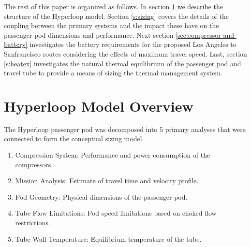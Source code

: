 \documentclass[heading.tex]{subfiles}
\begin{document}
The rest of this paper is organized as follows. In section \ref{s:struct} we describe the structure of the Hyperloop 
model. Section \ref{s:sizing} covers the details of the coupling between the primary systems and the impact these have 
on the passenger pod dimensions and performance. Next section \ref{sec:compressor-and-battery}
investigates the battery requirements for the proposed Los Angeles to Sanfrancisco routes considering the effects 
of maximum travel speed. Last, section \ref{s:heatex} investigates the natural thermal equilibrium of the passenger pod and
travel tube to provide a means of sizing the thermal management system. 



\section{Hyperloop Model Overview}
\label{s:struct}

The Hyperloop passenger pod was decomposed into 5 primary analyses that were connected to 
form the conceptual sizing model. 

\begin{enumerate}
  \item Compression System: Performance and power consumption of the compressors.
  \item Mission Analysis: Estimate of travel time and velocity profile.
  \item Pod Geometry: Physical dimensions of the passenger pod.
  \item Tube Flow Limitations: Pod speed limitations based on choked flow restrictions.
  \item Tube Wall Temperature: Equilibrium temperature of the tube.
\end{enumerate}
\end{document}
